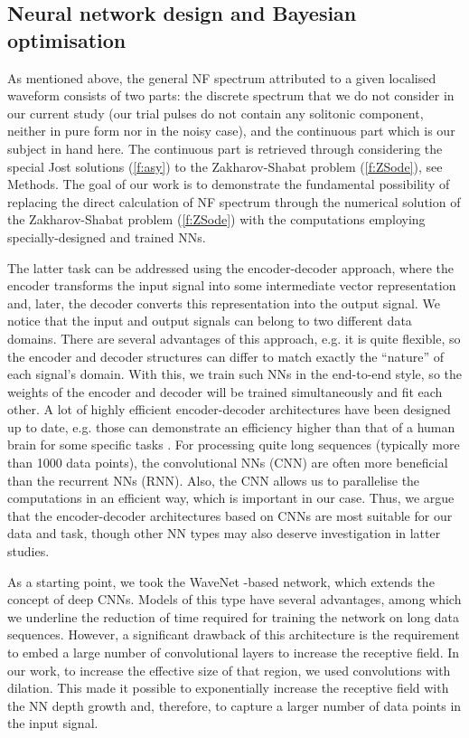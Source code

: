 \subsection*{Neural network design and Bayesian optimisation}


As mentioned above, the general NF spectrum attributed to a given localised waveform consists of two parts: the discrete spectrum that we do not consider in our current study (our trial pulses do not contain any solitonic component, neither in pure form nor in the noisy case), and the continuous part which is our subject in hand here. The continuous part is retrieved through considering the special Jost solutions (\ref{f:asy}) to the Zakharov-Shabat problem (\ref{f:ZSode}), see Methods. The goal of our work is to demonstrate the fundamental possibility of replacing the direct calculation of NF spectrum through the numerical solution of the Zakharov-Shabat problem (\ref{f:ZSode}) with the computations employing specially-designed and trained NNs.

The latter task can be addressed using the encoder-decoder approach, where the encoder transforms the input signal into some intermediate vector representation and, later, the decoder converts this representation into the output signal. We notice that the input and output signals can belong to two different data domains. There are several advantages of this approach, e.g. it is quite flexible, so the encoder and decoder structures can differ to match exactly the ``nature'' of each signal's domain. With this, we train such NNs in the end-to-end style, so the weights of the encoder and decoder will be trained simultaneously and fit each other.
A lot of highly efficient encoder-decoder architectures have been designed up to date, e.g. those can demonstrate an efficiency higher than that of a human brain for some specific tasks \cite{ty2014deepface}. For processing quite long sequences (typically more than 1000 data points), the convolutional NNs (CNN) are often more beneficial than the recurrent NNs (RNN). Also, the CNN allows us to parallelise the computations in an efficient way, which is important in our case. Thus, we argue that the encoder-decoder architectures based on CNNs are most suitable for our data and task, though other NN types may also deserve investigation in latter studies.


As a starting point, we took the WaveNet \cite{od2016wavenet}-based network, which extends the concept of deep CNNs. 
Models of this type have several advantages, among which we underline the reduction of time required for training the network on long data sequences. 
However, a significant drawback of this architecture is the requirement to embed a large number of convolutional layers to increase the receptive field. In our work, to increase the effective size of that region, we used convolutions with dilation. This made it possible to exponentially increase the receptive field with the NN depth growth and, therefore, to capture a larger number of data points in the input signal.


